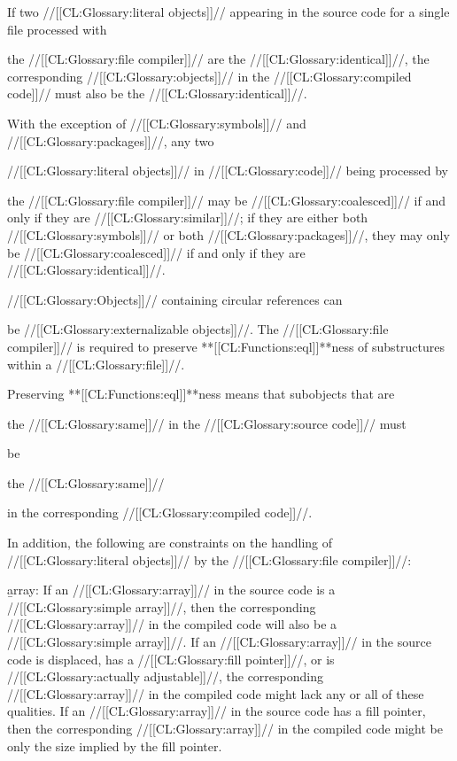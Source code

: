 If two //[[CL:Glossary:literal objects]]// appearing in the source code for a single file processed with

the //[[CL:Glossary:file compiler]]//  are the //[[CL:Glossary:identical]]//, the corresponding //[[CL:Glossary:objects]]// in the //[[CL:Glossary:compiled code]]//  must also be the //[[CL:Glossary:identical]]//. 

With the exception of //[[CL:Glossary:symbols]]// and //[[CL:Glossary:packages]]//, any two

//[[CL:Glossary:literal objects]]// in //[[CL:Glossary:code]]// being processed by

the //[[CL:Glossary:file compiler]]// may be //[[CL:Glossary:coalesced]]//  if and only if they are //[[CL:Glossary:similar]]//;  if they are either both //[[CL:Glossary:symbols]]// or both //[[CL:Glossary:packages]]//, they may only be //[[CL:Glossary:coalesced]]// if and only if they are //[[CL:Glossary:identical]]//.

 //[[CL:Glossary:Objects]]// containing circular references can 

be //[[CL:Glossary:externalizable objects]]//. The //[[CL:Glossary:file compiler]]// is required to preserve **[[CL:Functions:eql]]**ness of  substructures within a //[[CL:Glossary:file]]//.

Preserving **[[CL:Functions:eql]]**ness means that subobjects that are

the //[[CL:Glossary:same]]// in the //[[CL:Glossary:source code]]// must 

be

the //[[CL:Glossary:same]]//

in the corresponding //[[CL:Glossary:compiled code]]//.

In addition, the following are constraints on the handling of //[[CL:Glossary:literal objects]]// by the //[[CL:Glossary:file compiler]]//:
  \beginlist

 \item{}\b{array:} If an //[[CL:Glossary:array]]// in the source code is a //[[CL:Glossary:simple array]]//, then the corresponding //[[CL:Glossary:array]]// in the compiled code will also be a //[[CL:Glossary:simple array]]//.  If an //[[CL:Glossary:array]]// in the source code is displaced, has a  //[[CL:Glossary:fill pointer]]//, or is //[[CL:Glossary:actually adjustable]]//, the corresponding  //[[CL:Glossary:array]]// in the compiled code might lack any or all of these qualities. If an //[[CL:Glossary:array]]// in the source code has a fill pointer, then the corresponding //[[CL:Glossary:array]]// in the compiled code might be only the size implied by the fill pointer.

